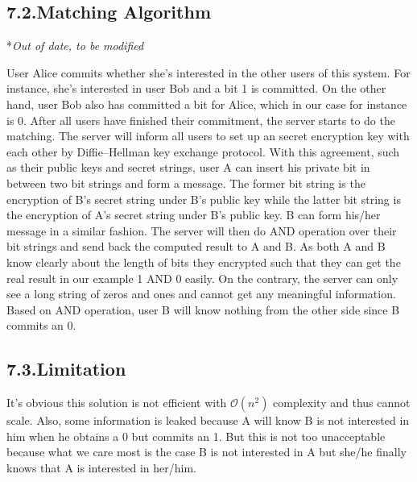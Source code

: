 \documentclass{article}
\begin{document}
\subsection{7.2.\hspace*{0.5em}Matching Algorithm}\label{sec-matching-algorithm}%

\noindent{}*\emph{Out of date, to be modified}%

User Alice commits whether she's interested in the other users of this system. For instance, she's interested in user Bob and a bit 1 is committed. On the other hand, user Bob also has committed a bit for Alice, which in our case for instance is 0. After all users have finished their commitment, the server starts to do the matching. The server will inform all users to set up an secret encryption key with each other by Diffie–Hellman key exchange protocol. With this agreement, such as their public keys and secret strings, user A can insert his private bit in between two bit strings and form a message. The former bit string is the encryption of B's secret string under B's public key while the latter bit string is the encryption of A's secret string under B's public key. B can form his/her message in a similar fashion. The server will then do AND operation over their bit strings and send back the computed result to A and B. As both A and B know clearly about the length of bits they encrypted such that they can get the real result in our example 1 AND 0 easily. On the contrary, the server can only see a long string of zeros and ones and cannot get any meaningful information. Based on AND operation, user B will know nothing from the other side since B commits an 0.%

\subsection{7.3.\hspace*{0.5em}Limitation}\label{sec-limitation}%

\noindent{}It's obvious this solution is not efficient with $\mathcal{O}(n^2)$ complexity and thus cannot scale. Also, some information is leaked because A will know B is not interested in him when he obtains a 0 but commits an 1. But this is not too unacceptable because what we care most is the case B is not interested in A but she/he finally knows that A is interested in her/him.%
\end{document}

